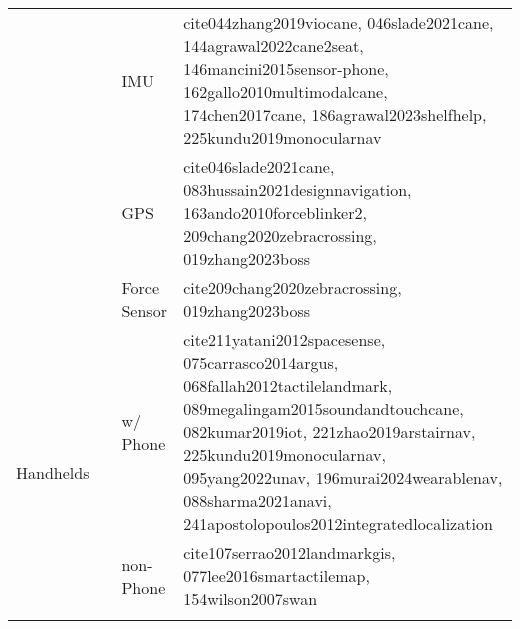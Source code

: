\begin{table*}[htbp!]
\begin{tabular}{c c l p{}}
        & 
        &
        IMU &
        cite{044zhang2019viocane, 046slade2021cane, 144agrawal2022cane2seat, 146mancini2015sensor-phone, 162gallo2010multimodalcane, 174chen2017cane, 186agrawal2023shelfhelp, 225kundu2019monocularnav} \\
        
        & 
        &
        GPS & 
        cite{046slade2021cane, 083hussain2021designnavigation, 163ando2010forceblinker2, 209chang2020zebracrossing, 019zhang2023boss} \\

        &
        &
        Force Sensor & 
        cite{209chang2020zebracrossing, 019zhang2023boss} \\
        
        \midrule
        
        \multirow{3}{*}{Handhelds} & 
        \multirow{3}{*}{} &
        w/ Phone &
        cite{211yatani2012spacesense, 075carrasco2014argus, 068fallah2012tactilelandmark, 089megalingam2015soundandtouchcane, 082kumar2019iot, 221zhao2019arstairnav, 225kundu2019monocularnav, 095yang2022unav, 196murai2024wearablenav, 088sharma2021anavi, 241apostolopoulos2012integratedlocalization}\\ 
        
        & 
        &
        non-Phone & 
        cite{107serrao2012landmarkgis, 077lee2016smartactilemap, 154wilson2007swan}  \\
        
         \bottomrule
    \label{tab:detailed-robot-types}
    \end{tabular}
\end{table*}

